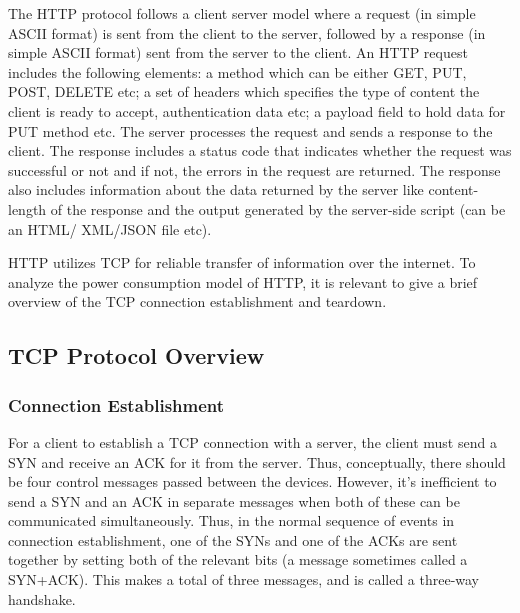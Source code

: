 \documentclass{sigplanconf}
\begin{document}
The HTTP protocol follows a client server model where a request (in simple ASCII format) is sent from the client to the server, followed by a response (in simple ASCII format) sent from the server to the client. An HTTP request includes the following elements: a method which can be either GET, PUT, POST, DELETE etc; a set of headers which specifies the type of content the client is ready to accept, authentication data etc; a payload field to hold data for PUT method etc. The server processes the request and sends a response to the client. The response includes a status code that indicates whether the request was successful or not and if not, the errors in the request are returned. The response also includes information about the data returned by the server like content-length of the response and the output generated by the server-side script (can be an HTML/ XML/JSON file etc). 

HTTP utilizes TCP for reliable transfer of information over the internet. To analyze the power consumption model of HTTP, it is relevant to give a brief overview of the TCP connection establishment and teardown.


\subsection{TCP Protocol Overview}
\subsubsection{Connection Establishment}
For a client to establish a TCP connection with a server, the client must send a SYN and receive an ACK for it from the server. Thus, conceptually, there should be four control messages passed between the devices. However, it's inefficient to send a SYN and an ACK in separate messages when both of these can be communicated simultaneously. Thus, in the normal sequence of events in connection establishment, one of the SYNs and one of the ACKs are sent together by setting both of the relevant bits (a message sometimes called a SYN+ACK). This makes a total of three messages, and is called a three-way handshake.
\end{document}
